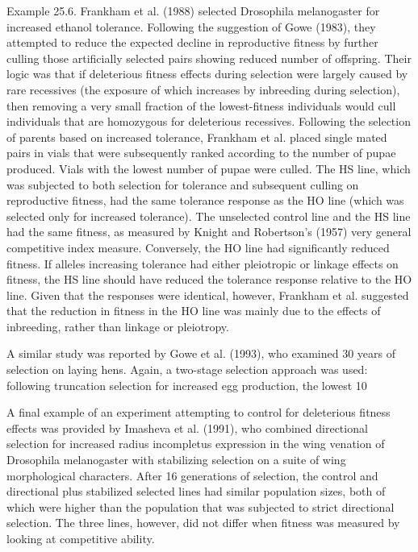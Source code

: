 \documentclass{article}
\begin{document}
Example 25.6. Frankham et al. (1988) selected Drosophila melanogaster for increased ethanol tolerance. Following the suggestion of Gowe (1983), they attempted to reduce the expected decline in reproductive fitness by further culling those artificially selected pairs showing reduced number of offspring. Their logic was that if deleterious fitness effects during selection were largely caused by rare recessives (the exposure of which increases by inbreeding during selection), then removing a very small fraction of the lowest-fitness individuals would cull individuals that are homozygous for deleterious recessives. Following the selection of parents based on increased tolerance, Frankham et al. placed single mated pairs in vials that were subsequently ranked according to the number of pupae produced. Vials with the lowest number of pupae were culled. The HS line, which was subjected to both selection for tolerance and subsequent culling on reproductive fitness, had the same tolerance response as the HO line (which was selected only for increased tolerance). The unselected control line and the HS line had the same fitness, as measured by Knight and Robertson's (1957) very general competitive index measure. Conversely, the HO line had significantly reduced fitness. If alleles increasing tolerance had either pleiotropic or linkage effects on fitness, the HS line should have reduced the tolerance response relative to the HO line. Given that the responses were identical, however, Frankham et al. suggested that the reduction in fitness in the HO line was mainly due to the effects of inbreeding, rather than linkage or pleiotropy.

A similar study was reported by Gowe et al. (1993), who examined 30 years of selection on laying hens. Again, a two-stage selection approach was used: following truncation selection for increased egg production, the lowest 10%

A final example of an experiment attempting to control for deleterious fitness effects was provided by Imasheva et al. (1991), who combined directional selection for increased radius incompletus expression in the wing venation of Drosophila melanogaster with stabilizing selection on a suite of wing morphological characters. After 16 generations of selection, the control and directional plus stabilized selected lines had similar population sizes, both of which were higher than the population that was subjected to strict directional selection. The three lines, however, did not differ when fitness was measured by looking at competitive ability.
\end{document}

